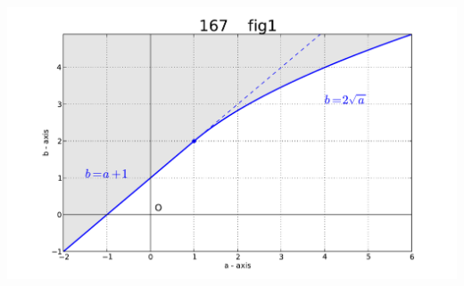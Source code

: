 \documentclass[a4j,10pt,oneside,openany]{jsbook}
\begin{document}
\includegraphics[width=15cm]{figure_1.pdf}


\vspace{1\baselineskip}
\end{document}
